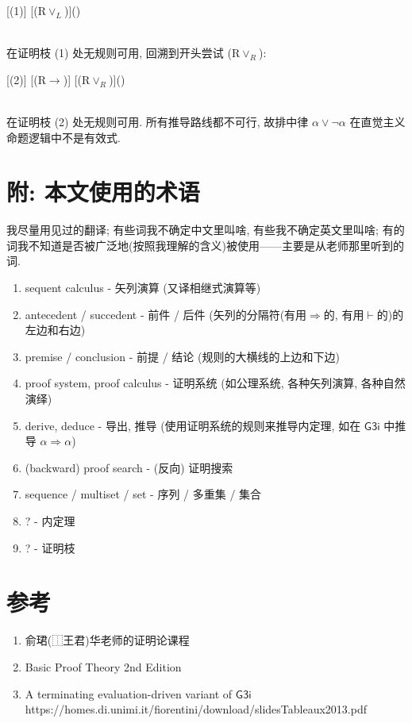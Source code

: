 \documentclass{article}
\def\To{\Rightarrow}
\def\a{\alpha}
\def\RVL{(R$\lor_L$)}
\def\RVR{(R$\lor_R$)}
\def\RI{(R$\to$)}
\def\Gthreei{$ \mathsf{G3i}$ }
\begin{document}
\begin{prooftree}[proof style=downwards]
	\Hypo{}
	[(1)]{\To \a}
	[\RVL]{\To \a\lor(\a\to\bot)}
\end{prooftree}\\

在证明枝 (1) 处无规则可用, 回溯到开头尝试 \RVR:\\

\begin{prooftree}[proof style=downwards]
	\Hypo{}
	[(2)]{\a \To \bot}
	[\RI]{\To \a\to\bot}
	[\RVR]{\To \a\lor(\a\to\bot)}
\end{prooftree}\\

在证明枝 (2) 处无规则可用. 所有推导路线都不可行, 故排中律 $\a\lor\neg\a$ 在直觉主义命题逻辑中不是有效式.

\section*{附: 本文使用的术语}

我尽量用见过的翻译; 有些词我不确定中文里叫啥, 有些我不确定英文里叫啥; 有的词我不知道是否被广泛地(按照我理解的含义)被使用——主要是从老师那里听到的词.

\begin{enumerate}
	\item sequent calculus - 矢列演算 (又译相继式演算等)
	\item antecedent / succedent - 前件 / 后件 (矢列的分隔符(有用$\To$的, 有用$\vdash$的)的左边和右边)
	\item premise / conclusion -  前提 / 结论 (规则的大横线的上边和下边)
	\item proof system, proof calculus - 证明系统 (如公理系统, 各种矢列演算, 各种自然演绎)
	\item derive, deduce - 导出, 推导 (使用证明系统的规则来推导内定理, 如在 \Gthreei 中推导 $\a\To\a$)
	\item (backward) proof search - (反向) 证明搜索 
	\item sequence / multiset / set - 序列 / 多重集 / 集合
	\item ? - 内定理
	\item ? - 证明枝
\end{enumerate}


\section*{参考}


\begin{enumerate}
	\item 俞珺(⿰王君)华老师的证明论课程
	\item Basic Proof Theory 2nd Edition
	\item A terminating evaluation-driven variant of \Gthreei  https://homes.di.unimi.it/fiorentini/download/slidesTableaux2013.pdf
\end{enumerate}
\end{document}
